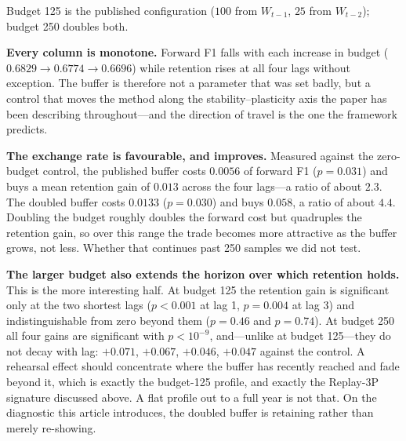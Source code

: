 \begin{table}[t]
  \centering
  \caption{Replay budget against forward accuracy and backward retention on Qwen2.5-Coder-1.5B. Budget counts rehearsal samples drawn from $W_{t-1}$ and $W_{t-2}$; the zero-budget row is window-only, which holds no buffer. All other settings are identical.}
  \label{tab:buffer}
  \vspace{1mm}
  {\footnotesize Budget 125 is the published configuration ($100$ from $W_{t-1}$, $25$ from $W_{t-2}$); budget 250 doubles both.}
\end{table}

\textbf{Every column is monotone.} Forward F1 falls with each increase in budget ($0.6829 \rightarrow 0.6774 \rightarrow 0.6696$) while retention rises at all four lags without exception. The buffer is therefore not a parameter that was set badly, but a control that moves the method along the stability--plasticity axis the paper has been describing throughout---and the direction of travel is the one the framework predicts.

\textbf{The exchange rate is favourable, and improves.} Measured against the zero-budget control, the published buffer costs $0.0056$ of forward F1 ($p=0.031$) and buys a mean retention gain of $0.013$ across the four lags---a ratio of about $2.3$. The doubled buffer costs $0.0133$ ($p=0.030$) and buys $0.058$, a ratio of about $4.4$. Doubling the budget roughly doubles the forward cost but quadruples the retention gain, so over this range the trade becomes more attractive as the buffer grows, not less. Whether that continues past 250 samples we did not test.

\textbf{The larger budget also extends the horizon over which retention holds.} This is the more interesting half. At budget 125 the retention gain is significant only at the two shortest lags ($p<0.001$ at lag 1, $p=0.004$ at lag 3) and indistinguishable from zero beyond them ($p=0.46$ and $p=0.74$). At budget 250 all four gains are significant with $p<10^{-9}$, and---unlike at budget 125---they do not decay with lag: $+0.071$, $+0.067$, $+0.046$, $+0.047$ against the control. A rehearsal effect should concentrate where the buffer has recently reached and fade beyond it, which is exactly the budget-125 profile, and exactly the Replay-3P signature discussed above. A flat profile out to a full year is not that. On the diagnostic this article introduces, the doubled buffer is retaining rather than merely re-showing.

